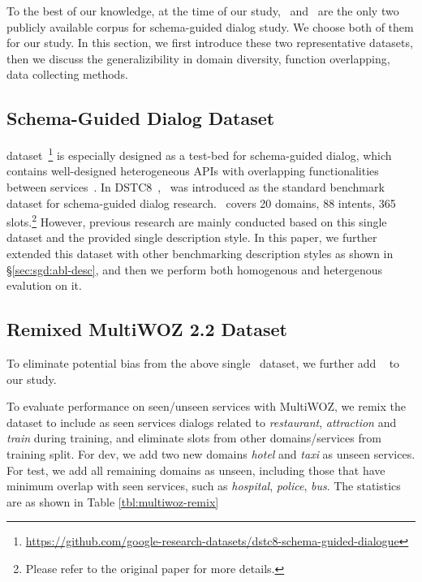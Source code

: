 To the best of our knowledge, at the time of our study, \sgdst~and
\multiwoz~are the only two publicly available corpus for schema-guided
dialog study. We choose both of them for our study. In this section,
we first introduce these two representative datasets, then we discuss
the generalizibility in domain diversity, function overlapping, data
collecting methods.

\subsection{Schema-Guided Dialog Dataset}
\label{ssec:sgd:schema-dataset}
\sgdst
dataset~\footnote{\url{https://github.com/google-research-datasets/dstc8-schema-guided-dialogue}}
is especially designed as a test-bed for schema-guided dialog, which
contains well-designed heterogeneous APIs with overlapping
functionalities between services~\cite{rastogi2019towards}. In
DSTC8~\cite{rastogi2020schema}, \sgdst~was introduced as the standard
benchmark dataset for schema-guided dialog research. \sgdst~covers 20
domains, 88 intents, 365 slots.\footnote{Please refer to the original
  paper for more details.} However, previous research are mainly
conducted based on this single dataset and the provided single
description style. In this paper, we further extended this dataset
with other benchmarking description styles as shown in
\S\ref{sec:sgd:abl-desc}, and then we perform both homogenous and
hetergenous evalution on it.

\subsection{Remixed MultiWOZ 2.2 Dataset}
\label{ssec:sgd:multiwoz-dataset}

To eliminate potential bias from the above single \sgdst~dataset, we
further add \multiwoz~\cite{zang-etal-2020-multiwoz} to our study.

 To evaluate performance on
seen/unseen services with MultiWOZ, we remix the \multiwoz dataset to
include as seen services dialogs related to \textit{restaurant},
\textit{attraction} and \textit{train} during training, and eliminate
slots from other domains/services from training split.  For dev, we
add two new domains {\it hotel} and {\it taxi} as unseen services. For
test, we add all remaining domains as unseen, including those that
have minimum overlap with seen services, such as {\it hospital}, {\it
  police}, {\it bus}. The statistics are as shown in Table
\ref{tbl:multiwoz-remix}

